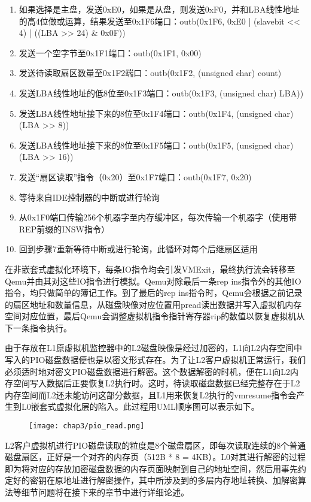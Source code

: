 \begin{enumerate}
\item 如果选择是主盘，发送0xE0，如果是从盘，则发送0xF0，并和LBA线性地址的高4位做或运算，结果发送至0x1F6端口：outb(0x1F6, 0xE0 | (slavebit << 4) | ((LBA >> 24) \& 0x0F))
\item 发送一个空字节至0x1F1端口：outb(0x1F1, 0x00)
\item 发送待读取扇区数量至0x1F2端口：outb(0x1F2, (unsigned char) count)
\item 发送LBA线性地址的低8位至0x1F3端口：outb(0x1F3, (unsigned char) LBA))
\item 发送LBA线性地址接下来的8位至0x1F4端口：outb(0x1F4, (unsigned char)(LBA >> 8))
\item 发送LBA线性地址接下来的8位至0x1F5端口：outb(0x1F5, (unsigned char)(LBA >> 16))
\item 发送``扇区读取''指令（0x20）至0x1F7端口：outb(0x1F7, 0x20)
\item 等待来自IDE控制器的中断或进行轮询
\item 从0x1F0端口传输256个机器字至内存缓冲区，每次传输一个机器字（使用带REP前缀的INSW指令）
\item 回到步骤7重新等待中断或进行轮询，此循环对每个后继扇区适用
\end{enumerate}

在非嵌套式虚拟化环境下，每条IO指令均会引发VMExit，最终执行流会转移至Qemu并由其对这些IO指令进行模拟。Qemu对除最后一条rep ins指令外的其他IO指令，均只做简单的簿记工作。到了最后的rep ins指令时，Qemu会根据之前记录的扇区地址和数量信息，从磁盘映像对应位置用pread读出数据并写入虚拟机内存空间对应位置，最后Qemu会调整虚拟机指令指针寄存器rip的数值以恢复虚拟机从下一条指令执行。

由于存放在L1原虚拟机监控器中的L2磁盘映像是经过加密的，L1向L2内存空间中写入的PIO磁盘数据便也是以密文形式存在。为了让L2客户虚拟机正常运行，我们必须适时地对密文PIO磁盘数据进行解密。这个数据解密的时机，便在L1向L2内存空间写入数据后正要恢复L2执行时。这时，待读取磁盘数据已经完整存在于L2内存空间而L2还未能访问这部分数据，且L1用来恢复L2执行的vmresume指令会产生到L0嵌套式虚拟化层的陷入。此过程用UML顺序图可以表示如下。

\begin{figure}[!htbp]
  \centering
  \texttt{[image: chap3/pio\_read.png]}
\end{figure}

L2客户虚拟机进行PIO磁盘读取的粒度是8个磁盘扇区，即每次读取连续的8个普通磁盘扇区，正好是一个对齐的内存页（512B * 8 = 4KB）。L0对其进行解密的过程即为将对应的存放加密磁盘数据的内存页面映射到自己的地址空间，然后用事先约定好的密钥在原地址进行解密操作，其中所涉及到的多层内存地址转换、加解密算法等细节问题将在接下来的章节中进行详细论述。

